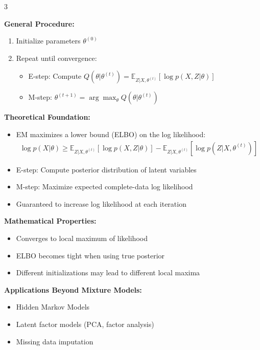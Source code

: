 \documentclass[10pt,landscape]{article}
\begin{document}
\begin{multicols}{3}
\begin{tcolorbox}[breakable, title=6.1 Expectation-Maximization (EM) Algorithm, colback=mixture,boxsep=1pt,left=1pt,right=1pt,top=1pt,bottom=1pt]
\textbf{General Procedure:}
\begin{enumerate}[leftmargin=*,noitemsep,topsep=0pt]
    \item Initialize parameters $\theta^{(0)}$
    \item Repeat until convergence:
    \begin{itemize}[leftmargin=*,noitemsep]
        \item E-step: Compute 
        $Q(\theta|\theta^{(t)}) = \mathbb{E}_{Z|X,\theta^{(t)}}[\log p(X, Z|\theta)]$
        \item M-step: $\theta^{(t+1)} = \arg\max_\theta Q(\theta|\theta^{(t)})$
    \end{itemize}
\end{enumerate}

\textbf{Theoretical Foundation:}
\begin{itemize}[leftmargin=*,noitemsep,topsep=0pt]
    \item EM maximizes a lower bound (ELBO) on the log likelihood:
    \begin{align}
    \log p(X|\theta) \geq \mathbb{E}_{Z|X,\theta^{(t)}}[\log p(X,Z|\theta)] - \mathbb{E}_{Z|X,\theta^{(t)}}[\log p(Z|X,\theta^{(t)})]
    \end{align}
    \item E-step: Compute posterior distribution of latent variables
    \item M-step: Maximize expected complete-data log likelihood
    \item Guaranteed to increase log likelihood at each iteration
\end{itemize}

\textbf{Mathematical Properties:}
\begin{itemize}[leftmargin=*,noitemsep,topsep=0pt]
    \item Converges to local maximum of likelihood
    \item ELBO becomes tight when using true posterior
    \item Different initializations may lead to different local maxima
\end{itemize}

\textbf{Applications Beyond Mixture Models:}
\begin{itemize}[leftmargin=*,noitemsep,topsep=0pt]
    \item Hidden Markov Models
    \item Latent factor models (PCA, factor analysis)
    \item Missing data imputation
\end{itemize}
\end{tcolorbox}


\end{multicols}
\end{document}
